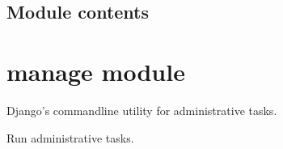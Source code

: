 \documentclass[letterpaper,10pt,polish]{sphinxmanual}
\begin{document}
\subsection{Module contents}
\label{\detokenize{mainApp:module-mainApp}}\label{\detokenize{mainApp:module-contents}}
\sphinxstepscope


\section{manage module}
\label{\detokenize{manage:module-manage}}\label{\detokenize{manage:manage-module}}\label{\detokenize{manage::doc}}
\sphinxAtStartPar
Django’s command\sphinxhyphen{}line utility for administrative tasks.

\begin{fulllineitems}
\label{\detokenize{manage:manage.main}}
\pysigstartsignatures
{}
\pysigstopsignatures
\sphinxAtStartPar
Run administrative tasks.

\end{fulllineitems}
\end{document}
